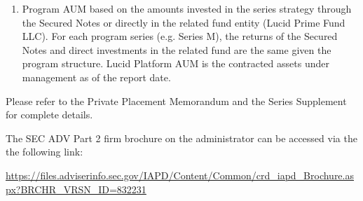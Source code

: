 \documentclass[9pt]{article}
\begin{document}
\begin{enumerate}
        \item Program AUM based on the amounts invested in the series strategy through the Secured Notes or directly in the related fund entity (Lucid Prime Fund LLC). For each program series (e.g. Series M), the returns of the Secured Notes and direct investments in the related fund are the same given the program structure. Lucid Platform AUM is the contracted assets under management as of the report date.

    \end{enumerate}

    \noindent Please refer to the Private Placement Memorandum and the Series Supplement for complete details.

        {\color{gray} \noindent The SEC ADV Part 2 firm brochure on the administrator can be accessed via the the following link:

    \noindent\underline{https://files.adviserinfo.sec.gov/IAPD/Content/Common/crd\_iapd\_Brochure.aspx?BRCHR\_VRSN\_ID=832231}}
\end{document}
